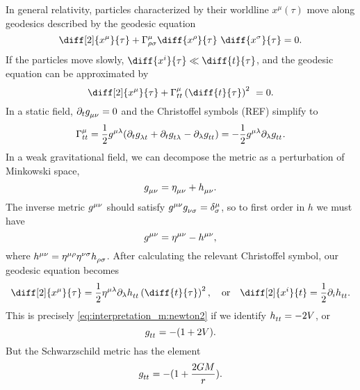 \documentclass[a4paper,11pt,twoside]{report}
\begin{document}
In general relativity, particles characterized by their worldline $x^\mu(\tau)$ move along geodesics described by the geodesic equation
\begin{equation*}
	\diff[2]{x^\mu}{\tau} + \Gamma^\mu_{\rho \sigma} \diff{x^\rho}{\tau} \diff{x^\sigma}{\tau} = 0 .
\end{equation*}
If the particles move slowly, $\diff{x^i}{\tau} \ll \diff{t}{\tau}$, and the geodesic equation can be approximated by
\begin{equation}
	\diff[2]{x^\mu}{\tau} + \Gamma^\mu_{tt} \left( \diff{t}{\tau} \right)^2 = 0 .
\end{equation}
In a static field, $\partial_t g\indices{_\mu_\nu} = 0$ and the Christoffel symbols (REF) simplify to
\begin{equation*}
	\Gamma^\mu_{tt} = \frac{1}{2} g\indices{^\mu^\lambda} (\partial_t g\indices{_\lambda_t} + \partial_t g\indices{_t_\lambda} - \partial_\lambda g\indices{_t_t}) = -\frac{1}{2} g\indices{^\mu^\lambda} \partial_\lambda g\indices{_t_t} .
\end{equation*}
In a weak gravitational field, we can decompose the metric as a perturbation of Minkowski space,
\begin{equation}
	g\indices{_\mu_\nu} = \eta\indices{_\mu_\nu} + h\indices{_\mu_\nu} .
\end{equation}
The inverse metric $g\indices{^\mu^\nu}$ should satisfy $g\indices{^\mu^\nu} g\indices{_\nu_\sigma} = \delta^\mu_\sigma$, so to first order in $h$ we must have
\begin{equation}
	g\indices{^\mu^\nu} = \eta\indices{^\mu^\nu} - h\indices{^\mu^\nu} ,
\end{equation}
where $h\indices{^\mu^\nu} = \eta\indices{^\mu^\rho} \eta\indices{^\nu^\sigma} h\indices{_\rho_\sigma}$.
After calculating the relevant Christoffel symbol, our geodesic equation becomes
\begin{equation}
	\diff[2]{x^\mu}{\tau} = \frac{1}{2} \eta\indices{^\mu^\lambda} \partial_\lambda h\indices{_t_t} \left( \diff{t}{\tau} \right)^2 ,
	\quad \text{or} \quad
	\diff[2]{x^i}{t} = \frac{1}{2} \partial_i h\indices{_t_t} .
\end{equation}
This is precisely \cref{eq:interpretation_m:newton2} if we identify $h\indices{_t_t} = -2 V$, or
\begin{equation}
	g\indices{_t_t} = -(1 + 2 V) .
\end{equation}
But the Schwarzschild metric has the element
\begin{equation}
	g\indices{_t_t} = -(1 + \frac{2 G M}{r}) .
\end{equation}
\end{document}
